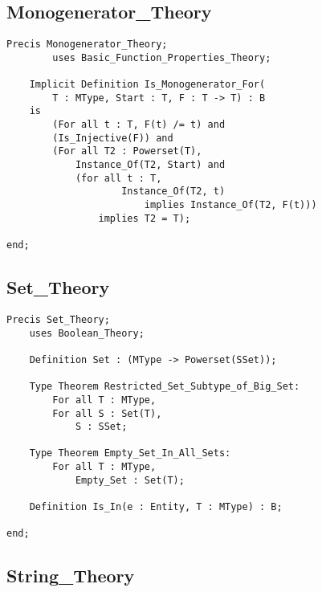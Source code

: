 	\subsection{Monogenerator\_Theory}	%

\begin{lstlisting}[language=resolve]
Precis Monogenerator_Theory;
		uses Basic_Function_Properties_Theory;

	Implicit Definition Is_Monogenerator_For(
		T : MType, Start : T, F : T -> T) : B
	is
		(For all t : T, F(t) /= t) and
		(Is_Injective(F)) and
		(For all T2 : Powerset(T),
			Instance_Of(T2, Start) and 
			(for all t : T, 
					Instance_Of(T2, t) 
						implies Instance_Of(T2, F(t)))
				implies T2 = T);

end;
\end{lstlisting}

	\subsection{Set\_Theory}	%

\begin{lstlisting}[language=resolve]
Precis Set_Theory;
    uses Boolean_Theory;

	Definition Set : (MType -> Powerset(SSet));

	Type Theorem Restricted_Set_Subtype_of_Big_Set:
		For all T : MType,
		For all S : Set(T),
			S : SSet;

	Type Theorem Empty_Set_In_All_Sets:
		For all T : MType,
			Empty_Set : Set(T);

	Definition Is_In(e : Entity, T : MType) : B;

end;

\end{lstlisting}

	\subsection{String\_Theory}	%

